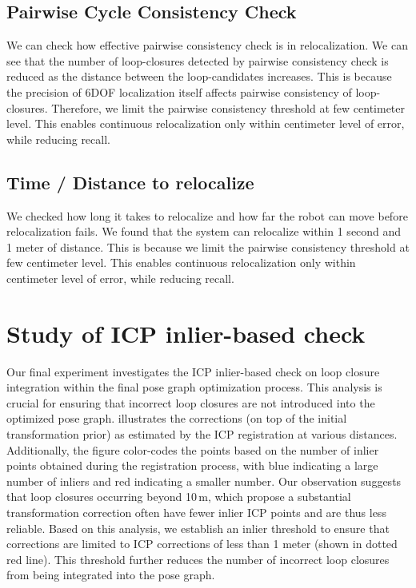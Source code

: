 \subsection*{Pairwise Cycle Consistency Check}
We can check how effective pairwise consistency check is in relocalization. We can see that the number of loop-closures detected by pairwise consistency check is reduced as the distance between the loop-candidates increases. This is because the precision of 6DOF localization itself affects pairwise consistency of loop-closures. Therefore, we limit the pairwise consistency threshold at few centimeter level. This enables continuous relocalization only within centimeter level of error, while reducing recall. 

\subsection*{Time / Distance to relocalize}
We checked how long it takes to relocalize and how far the robot can move before relocalization fails. We found that the system can relocalize within 1 second and 1 meter of distance. This is because we limit the pairwise consistency threshold at few centimeter level. This enables continuous relocalization only within centimeter level of error, while reducing recall.

\section{Study of ICP inlier-based check}
\label{sec:exp_icp_ablation}

Our final experiment investigates the ICP inlier-based check on loop closure integration within the final pose graph optimization process. This analysis is crucial for ensuring that incorrect loop closures are not introduced into the optimized pose graph.
 illustrates the corrections (on top of the initial transformation prior) as estimated by the ICP registration at various distances. Additionally, the figure color-codes the points based on the number of inlier points obtained during the registration process, with blue indicating a large number of inliers and red indicating a smaller number.
Our observation suggests that loop closures occurring beyond 10\,m, which propose a substantial transformation correction often have fewer inlier ICP points and are thus less reliable.
Based on this analysis, we establish an inlier threshold to ensure that corrections are limited to ICP corrections of less than 1 meter (shown in dotted red line). This threshold further reduces the number of incorrect loop closures from being integrated into the pose graph.


